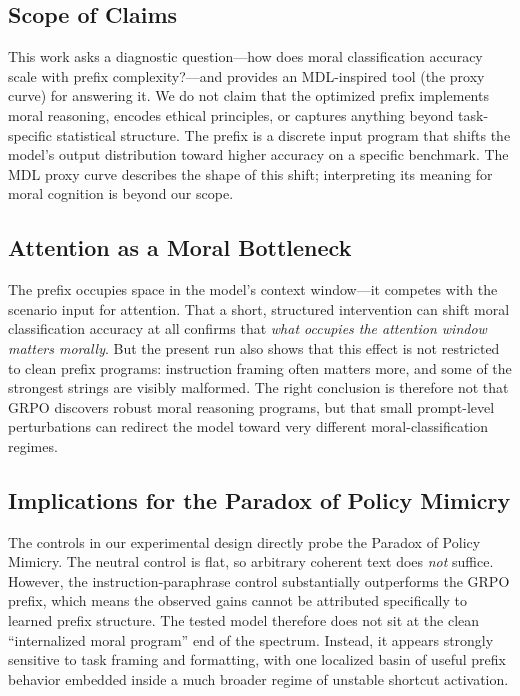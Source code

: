 \documentclass[preprint]{article}
\begin{document}
\subsection{Scope of Claims}

This work asks a diagnostic question---how does moral classification accuracy scale with prefix complexity?---and provides an MDL-inspired tool (the proxy curve) for answering it.
We do not claim that the optimized prefix implements moral reasoning, encodes ethical principles, or captures anything beyond task-specific statistical structure.
The prefix is a discrete input program that shifts the model's output distribution toward higher accuracy on a specific benchmark.
The MDL proxy curve describes the shape of this shift; interpreting its meaning for moral cognition is beyond our scope.

\subsection{Attention as a Moral Bottleneck}

The prefix occupies space in the model's context window---it competes with the scenario input for attention.
That a short, structured intervention can shift moral classification accuracy at all confirms that \emph{what occupies the attention window matters morally}.
But the present run also shows that this effect is not restricted to clean prefix programs: instruction framing often matters more, and some of the strongest strings are visibly malformed.
The right conclusion is therefore not that GRPO discovers robust moral reasoning programs, but that small prompt-level perturbations can redirect the model toward very different moral-classification regimes.

\subsection{Implications for the Paradox of Policy Mimicry}

The controls in our experimental design directly probe the Paradox of Policy Mimicry.
The neutral control is flat, so arbitrary coherent text does \emph{not} suffice.
However, the instruction-paraphrase control substantially outperforms the GRPO prefix, which means the observed gains cannot be attributed specifically to learned prefix structure.
The tested model therefore does not sit at the clean ``internalized moral program'' end of the spectrum.
Instead, it appears strongly sensitive to task framing and formatting, with one localized basin of useful prefix behavior embedded inside a much broader regime of unstable shortcut activation.
\end{document}
